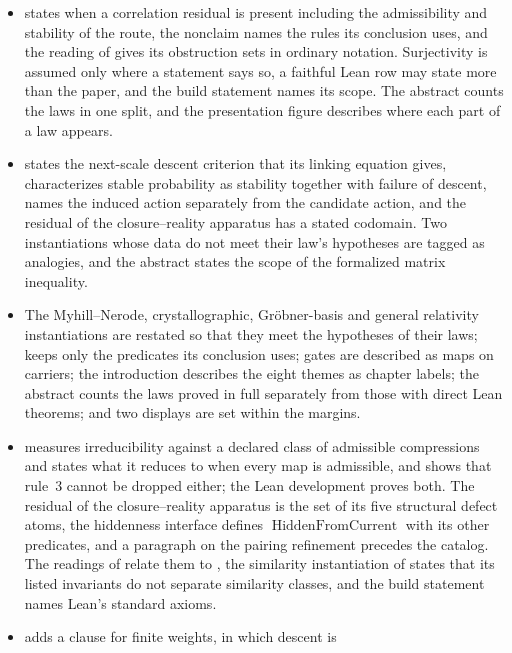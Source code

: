 \begin{itemize}
  that carry their hypothesis-free clauses.
\item {} states when a correlation residual is present including
  the admissibility and stability of the route, the  nonclaim names
  the rules its conclusion uses, and the reading of  gives its
  obstruction sets in ordinary notation. Surjectivity is assumed only where a
  statement says so, a faithful Lean row may state more than the paper, and
  the build statement names its scope. The abstract counts the laws in one
  split, and the presentation figure describes where each part of a law
  appears.
\item {} states the next-scale descent criterion that its
  linking equation gives,  characterizes stable probability as
  stability together with failure of descent,  names the
  induced action separately from the candidate action, and the residual of
  the closure--reality apparatus has a stated codomain. Two instantiations
  whose data do not meet their law's hypotheses are tagged as analogies, and
  the abstract states the scope of the formalized matrix inequality.
\item The Myhill--Nerode, crystallographic, Gr\"obner-basis and general
  relativity instantiations are restated so that they meet the hypotheses of
  their laws;  keeps only the predicates its conclusion uses;
  gates are described as maps on carriers; the introduction describes the
  eight themes as chapter labels; the abstract counts the laws proved in full
  separately from those with direct Lean theorems; and two displays are set
  within the margins.
\item {} measures irreducibility against a declared class of
  admissible compressions and states what it reduces to when every map is
  admissible, and  shows that rule~3 cannot be dropped either;
  the Lean development proves both. The residual of the closure--reality
  apparatus is the set of its five structural defect atoms, the hiddenness
  interface defines \(\operatorname{HiddenFromCurrent}\) with its other
  predicates, and a paragraph on the pairing refinement precedes the
  catalog. The readings of  relate them to
  , the similarity instantiation of 
  states that its listed invariants do not separate similarity classes, and
  the build statement names Lean's standard axioms.
\item {} adds a clause for finite weights, in which descent is

\end{itemize}
